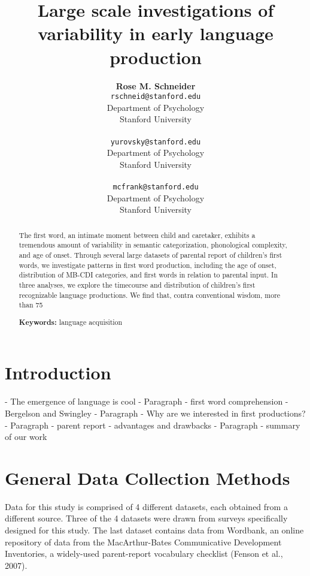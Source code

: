 \documentclass[10pt,letterpaper]{article}
\title{Large scale investigations of variability in early language production}
\author{{\large \bf Rose M. Schneider} \\ \texttt{rschneid@stanford.edu}\\ Department of Psychology \\ Stanford University \\ 
\And {\large \bf Dan Yurovsky} \\ \texttt{yurovsky@stanford.edu} \\ Department of Psychology \\ Stanford University \\ 
\And {\large \bf Michael C. Frank} \\ \texttt{mcfrank@stanford.edu} \\ Department of Psychology \\ Stanford University \\ }
\begin{document}
\maketitle


\begin{abstract}
The first word, an intimate moment between child and caretaker, exhibits a tremendous amount of variability in semantic categorization, phonological complexity, and age of onset. Through several large datasets of parental report of children’s first words, we investigate patterns in first word production, including the age of onset, distribution of MB-CDI categories, and first words in relation to parental input. In three analyses, we explore the timecourse and distribution of children’s first recognizable language productions. We find that, contra conventional wisdom, more than 75%

\textbf{Keywords:}
language acquisition
\end{abstract}

\section{Introduction}
- The emergence of language is cool
- Paragraph - first word comprehension - Bergelson and Swingley
- Paragraph - Why are we interested in first productions?
- Paragraph - parent report - advantages and drawbacks 
- Paragraph - summary of our work

\section{General Data Collection Methods}
Data for this study is comprised of 4 different datasets, each obtained from a different source. Three of the 4 datasets were drawn from surveys specifically designed for this study. The last dataset contains data from Wordbank, an online repository of data from the MacArthur-Bates Communicative Development Inventories, a widely-used parent-report vocabulary checklist (Fenson et al., 2007). 
\end{document}
